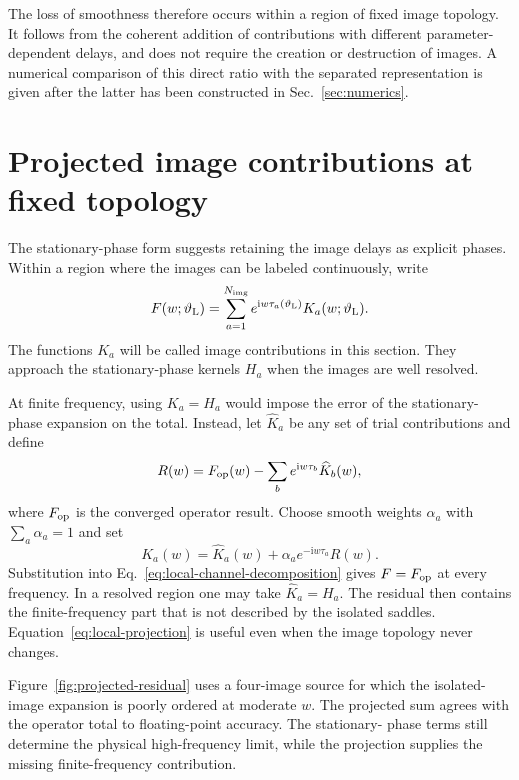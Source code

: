 \documentclass[aps,prd,twocolumn,nofootinbib,superscriptaddress,floatfix]{revtex4-2}
\newcommand{\ii}{\mathrm{i}}
\begin{document}
The loss of smoothness therefore occurs within a region of fixed image
topology.  It follows from the coherent addition of contributions with
different parameter-dependent delays, and does not require the creation or
destruction of images.  A numerical comparison of this direct ratio with the
separated representation is given after the latter has been constructed in
Sec.~\ref{sec:numerics}.

\section{Projected image contributions at fixed topology}
\label{sec:localchannels}

The stationary-phase form suggests retaining the image delays as explicit
phases.  Within a region where the images can be labeled continuously, write
\begin{equation}
 F(w;\vartheta_{\rm L})
 =\sum_{a=1}^{N_{\rm img}}
 e^{\ii w\tau_a(\vartheta_{\rm L})}
 K_a(w;\vartheta_{\rm L}).
 \label{eq:local-channel-decomposition}
\end{equation}
The functions $K_a$ will be called image contributions in this section.  They
approach the stationary-phase kernels $H_a$ when the images are well resolved.

At finite frequency, using $K_a=H_a$ would impose the error of the
stationary-phase expansion on the total.  Instead, let $\widehat K_a$ be any
set of trial contributions and define
\begin{equation}
 R(w)=F_{\rm op}(w)-\sum_b e^{\ii w\tau_b}\widehat K_b(w),
 \label{eq:local-residual}
\end{equation}
where $F_{\rm op}$ is the converged operator result.  Choose smooth weights
$\alpha_a$ with $\sum_a\alpha_a=1$ and set
\begin{equation}
 \boxed{
 K_a(w)=\widehat K_a(w)+
 \alpha_a e^{-\ii w\tau_a}R(w).}
 \label{eq:local-projection}
\end{equation}
Substitution into Eq.~\eqref{eq:local-channel-decomposition} gives
$F=F_{\rm op}$ at every frequency.  In a resolved region one may take
$\widehat K_a=H_a$.  The residual then contains the finite-frequency part that
is not described by the isolated saddles.  Equation~\eqref{eq:local-projection}
is useful even when the image topology never changes.

Figure~\ref{fig:projected-residual} uses a four-image source for which the
isolated-image expansion is poorly ordered at moderate $w$.  The projected sum
agrees with the operator total to floating-point accuracy.  The stationary-
phase terms still determine the physical high-frequency limit, while the
projection supplies the missing finite-frequency contribution.
\end{document}
